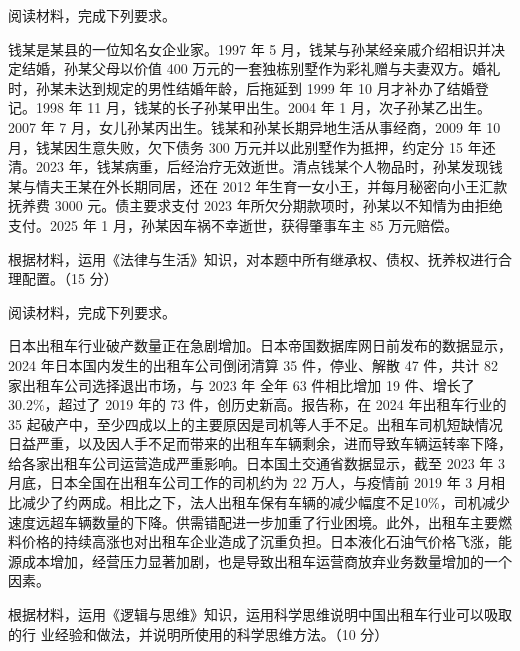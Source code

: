 \documentclass{exam-zh}
\newenvironment{kaiti-indented}{
  \parindent=2em
  \CJKfamily{zhkai}
  \setstretch{1.4}
}{
}
\begin{document}
\begin{question}
  阅读材料，完成下列要求。

  \begin{kaiti-indented}
    钱某是某县的一位知名女企业家。1997 年 5 月，钱某与孙某经亲戚介绍相识并决定结婚，孙某父母以价值 400 万元的一套独栋别墅作为彩礼赠与夫妻双方。婚礼时，孙某未达到规定的男性结婚年龄，后拖延到 1999 年 10 月才补办了结婚登记。1998 年 11 月，钱某的长子孙某甲出生。2004 年 1 月，次子孙某乙出生。2007 年 7 月，女儿孙某丙出生。钱某和孙某长期异地生活从事经商，2009 年 10 月，钱某因生意失败，欠下债务 300 万元并以此别墅作为抵押，约定分 15 年还清。2023 年，钱某病重，后经治疗无效逝世。清点钱某个人物品时，孙某发现钱某与情夫王某在外长期同居，还在 2012 年生育一女小王，并每月秘密向小王汇款抚养费 3000 元。债主要求支付 2023 年所欠分期款项时，孙某以不知情为由拒绝支付。2025 年 1 月，孙某因车祸不幸逝世，获得肇事车主 85 万元赔偿。
  \end{kaiti-indented}

  根据材料，运用《法律与生活》知识，对本题中所有继承权、债权、抚养权进行合理配置。（15 分）
\end{question}
\vspace{-0.5em}

\begin{question}
  阅读材料，完成下列要求。

  \begin{kaiti-indented}
    日本出租车行业破产数量正在急剧增加。日本帝国数据库网日前发布的数据显示，2024 年日本国内发生的出租车公司倒闭清算 35 件，停业、解散 47 件，共计 82 家出租车公司选择退出市场，与 2023 年 全年 63 件相比增加 19 件、增长了 30.2\%，超过了 2019 年的 73 件，创历史新高。报告称，在 2024 年出租车行业的 35 起破产中，至少四成以上的主要原因是司机等人手不足。出租车司机短缺情况日益严重，以及因人手不足而带来的出租车车辆剩余，进而导致车辆运转率下降，给各家出租车公司运营造成严重影响。日本国土交通省数据显示，截至 2023 年 3 月底，日本全国在出租车公司工作的司机约为 22 万人，与疫情前 2019 年 3 月相比减少了约两成。相比之下，法人出租车保有车辆的减少幅度不足10\%，司机减少速度远超车辆数量的下降。供需错配进一步加重了行业困境。此外，出租车主要燃料价格的持续高涨也对出租车企业造成了沉重负担。日本液化石油气价格飞涨，能源成本增加，经营压力显著加剧，也是导致出租车运营商放弃业务数量增加的一个因素。
  \end{kaiti-indented}

  根据材料，运用《逻辑与思维》知识，运用科学思维说明中国出租车行业可以吸取的行
  业经验和做法，并说明所使用的科学思维方法。（10 分）
\end{question}
\vspace{-0.5em}
\end{document}
